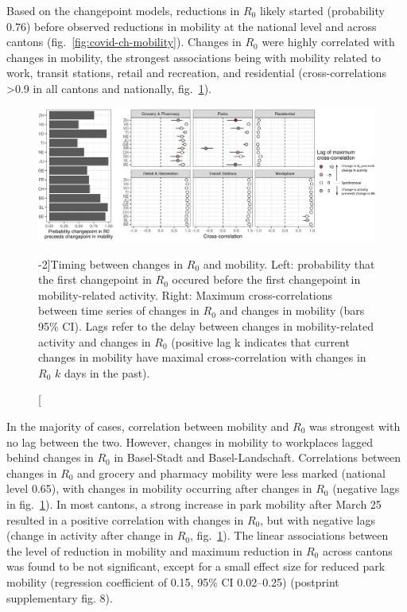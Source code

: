 Based on the changepoint models, reductions in $R_0$ likely started (probability 0.76) before observed reductions in mobility at the national level and across cantons (fig.~\ref{fig:covid-ch-mobility}). Changes in $R_0$ were highly correlated with changes in mobility, the strongest associations being with mobility related to work, transit stations, retail and recreation, and residential (cross-correlations >0.9 in all cantons and nationally, fig.~\ref{fig:covid-ch-timing}). 
\begin{figure}\centering
  \includegraphics[width=\textwidth]{fig_covid-switzerland-npi/FIGURE_4.png}
  \caption[Timing between changes in $R_0$ and mobility][-2\baselineskip]{Timing between changes in $R_0$ and mobility. Left: probability that the first changepoint in $R_0$ occured before the first changepoint in mobility-related activity. Right: Maximum cross-correlations between time series of changes in $R_0$ and changes in mobility (bars 95\% CI). Lags refer to the delay between changes in mobility-related activity and changes in $R_0$ (positive lag k indicates that current changes in mobility have maximal cross-correlation with changes in $R_0$ $k$ days in the past).}
  \label{fig:covid-ch-timing}
\end{figure}
In the majority of cases, correlation between mobility and $R_0$ was strongest with no lag between the two. However, changes in mobility to workplaces lagged behind changes in $R_0$ in Basel-Stadt and Basel-Landschaft. Correlations between changes in $R_0$ and grocery and pharmacy mobility were less marked (national level 0.65), with changes in mobility occurring after changes in $R_0$ (negative lags in fig.~\ref{fig:covid-ch-timing}). In most cantons, a strong increase in park mobility after March 25 resulted in a positive correlation with changes in $R_0$, but with negative lags (change in activity after change in $R_0$, fig.~\ref{fig:covid-ch-timing}). 
The linear associations between the level of reduction in mobility and maximum reduction in $R_0$ across cantons was found to be not significant, except for a small effect size for reduced park mobility (regression coefficient of 0.15, 95\% CI 0.02–0.25) (postprint supplementary fig. 8). 

